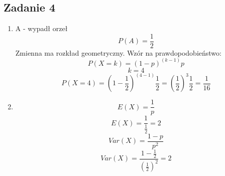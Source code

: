 \subsection{Zadanie 4}

\begin{enumerate}[label=(\alph*)]
\item
A - wypadł orzeł
$$ P(A)=\frac{1}{2} $$
Zmienna ma rozkład geometryczny. Wzór na prawdopodobieństwo:
$$ P(X=k)=(1-p)^{(k-1)}p $$
$$ k=4 $$
$$
P(X=4)=(1-\frac{1}{2})^{(4-1)}\frac{1}{2} = (\frac{1}{2})^3 \frac{1}{2} = \frac{1}{16}
$$

\item
$$ E(X) = \frac{1}{p} $$
$$ E(X) = \frac{1}{\frac{1}{2}} = 2 $$
$$ Var(X) = \frac{1-p}{p^2} $$
$$ Var(X) = \frac{1-\frac{1}{2}}{(\frac{1}{2})^2} = 2 $$
\end{enumerate}
